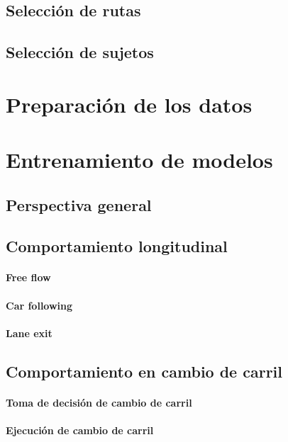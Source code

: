 \subsection{Selección de rutas}

\subsection{Selección de sujetos}

\section{Preparación de los datos}

\section{Entrenamiento de modelos}

\subsection{Perspectiva general}

\subsection{Comportamiento longitudinal}

\paragraph{Free flow}

\paragraph{Car following}

\paragraph{Lane exit}

\subsection{Comportamiento en cambio de carril}

\paragraph{Toma de decisión de cambio de carril}

\paragraph{Ejecución de cambio de carril}

